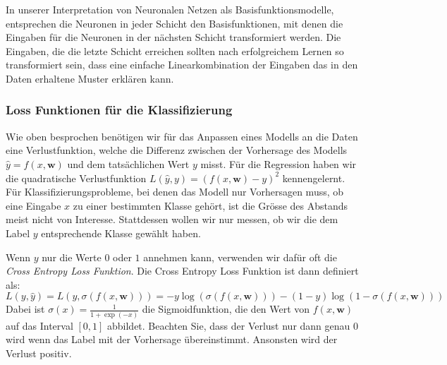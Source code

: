 In unserer Interpretation von Neuronalen Netzen als Basisfunktionsmodelle, entsprechen die Neuronen in jeder Schicht den  Basisfunktionen, mit denen die Eingaben für die Neuronen in der nächsten Schicht transformiert werden. 
Die Eingaben, die die letzte Schicht erreichen sollten nach erfolgreichem Lernen so transformiert sein, 
dass eine einfache Linearkombination der Eingaben das in den Daten erhaltene Muster erklären kann. 

\subsubsection{Loss Funktionen für die Klassifizierung}

Wie oben besprochen benötigen wir für das Anpassen eines Modells an die Daten eine Verlustfunktion, welche die Differenz zwischen der Vorhersage des Modells $\hat{y} = f(x, \textbf{w})$ und dem
tatsächlichen Wert  $y$ misst. Für die Regression haben wir die quadratische Verlustfunktion $L(\hat{y}, y) = (f(x,\textbf{w}) - y)^2$ kennengelernt. Für Klassifizierungsprobleme, bei denen das Modell nur Vorhersagen muss, ob eine Eingabe $x$ 
zu einer bestimmten Klasse gehört, ist die Grösse des Abstands meist nicht von Interesse. Stattdessen wollen 
wir nur messen, ob wir die dem Label $y$ entsprechende Klasse gewählt haben. 

Wenn $y$ nur die Werte $0$ oder $1$ annehmen kann, verwenden wir dafür oft die \emph{Cross Entropy Loss Funktion}.
Die Cross Entropy Loss Funktion ist dann definiert als:
\[
    L(y, \hat{y}) = L(y, \sigma(f(x, \textbf{w}))) = -y \log(\sigma(f(x, \textbf{w}))) - (1-y)\log(1-\sigma(f(x, \textbf{w})))
\]
Dabei ist $\sigma(x)=\frac{1}{1+\exp(-x)}$ die Sigmoidfunktion, die den Wert von $f(x, \textbf{w})$ auf das 
Interval $[0,1]$ abbildet. Beachten Sie, dass der Verlust nur dann genau 0 wird wenn das Label mit der Vorhersage übereinstimmt. Ansonsten wird der Verlust positiv. 





